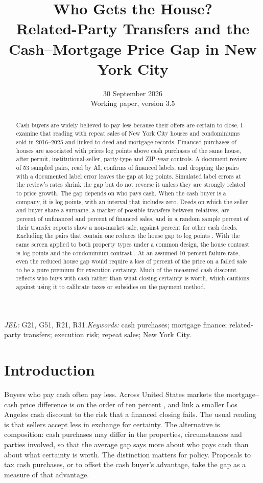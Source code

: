 \documentclass[12pt]{article}
\title{\bfseries Who Gets the House?\\[2mm]\large Related-Party Transfers and the Cash--Mortgage Price Gap in New York City}
\author{}
\date{30 September 2026\\\small Working paper, version 3.5}
\begin{document}
\maketitle
\begin{abstract}\singlespacing\noindent
Cash buyers are widely believed to pay less because their offers are certain to close. I examine that reading with repeat sales of New York City houses and condominiums sold in 2016--2025 and linked to deed and mortgage records. Financed purchases of houses are associated with prices \HouseGap{} log points above cash purchases of the same house, after permit, institutional-seller, party-type and ZIP-year controls. A document review of 53 sampled pairs, read by AI, confirms \ReviewFinConfirmed{} of \ReviewFinTotal{} financed labels, and dropping the \ReviewErrPairs{} pairs with a documented label error leaves the gap at \ReviewCorrected{} log points. Simulated label errors at the review's rates shrink the gap but do not reverse it unless they are strongly related to price growth. The gap depends on who pays cash. When the cash buyer is a company, it is \CompanyCash{} log points, with an interval that includes zero. Deeds on which the seller and buyer share a surname, a marker of possible transfers between relatives, are \RelShareCash{} percent of unfinanced and \RelShareFin{} percent of financed sales, and in a random sample \DeedShare{} percent of their transfer reports show a non-market sale, against \DeedUShare{} percent for other cash deeds. Excluding the \RelPairs{} pairs that contain one reduces the house gap to \NoRelOLS{} log points \NoRelOLSCI{}. With the same screen applied to both property types under a common design, the house contrast is \HouseBQNoRel{} log points and the condominium contrast \CondoNoRel{}. At an assumed 10 percent failure rate, even the reduced house gap would require a loss of \NoRelInvQTen{} percent of the price on a failed sale to be a pure premium for execution certainty. Much of the measured cash discount reflects who buys with cash rather than what closing certainty is worth, which cautions against using it to calibrate taxes or subsidies on the payment method.
\end{abstract}
\noindent\textit{JEL:} G21, G51, R21, R31.\quad\textit{Keywords:} cash purchases; mortgage finance; related-party transfers; execution risk; repeat sales; New York City.
\newpage

\section{Introduction}
Buyers who pay cash often pay less. Across United States markets the mortgage--cash price difference is on the order of ten percent \citep{reher2024}, and \citet{hanhong2024} link a smaller Los Angeles cash discount to the risk that a financed closing fails. The usual reading is that sellers accept less in exchange for certainty. The alternative is composition: cash purchases may differ in the properties, circumstances and parties involved, so that the average gap says more about who pays cash than about what certainty is worth. The distinction matters for policy. Proposals to tax cash purchases, or to offset the cash buyer's advantage, take the gap as a measure of that advantage.
\end{document}
